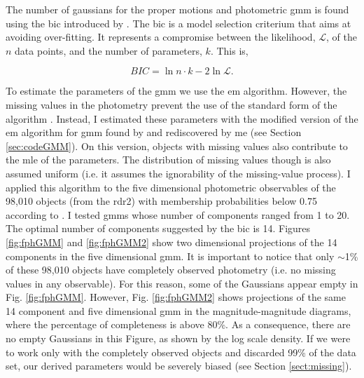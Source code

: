  

The number of gaussians for the proper motions and photometric \gls{gmm} is found using the \gls{bic} introduced by \citet{Schwarz1978}. The \gls{bic} is a model selection criterium that aims at avoiding over-fitting. It represents a compromise between the likelihood, $\mathcal{L}$, of the $n$ data points, and the number of parameters, $k$. This is,

\begin{equation}
\label{eq:BIC}
BIC = \ln{n}\cdot k - 2 \ln{\mathcal{L}}.
\end{equation}

To estimate the parameters of the \gls{gmm} we use the \gls{em} algorithm. However, the missing values in the photometry prevent the use of the standard form of the algorithm \cite[see for example Chapter 9 of][]{Bishop2006}.
Instead, I estimated these parameters with the modified version of the \gls{em} algorithm for \gls{gmm} found by \citet{McMichael1996} and rediscovered by me (see Section \ref{sec:codeGMM}). On this version, objects with missing values also contribute to the \gls{mle} of the parameters. The distribution of missing values though is also assumed uniform (i.e. it assumes the ignorability of the missing-value process). I applied this algorithm to the five dimensional photometric observables of the 98,010 objects (from the \gls{rdr2}) with membership probabilities below 0.75 according to \citet{Bouy2015}. I tested \glspl{gmm} whose number of components ranged from 1 to 20. The optimal number of components suggested by the \gls{bic} is 14. Figures \ref{fig:fphGMM} and \ref{fig:fphGMM2} show two dimensional projections of the 14 components in the five dimensional \gls{gmm}. It is important to notice that only $\sim$1\% of these 98,010 objects have completely observed photometry (i.e. no missing values in any observable). For this reason, some of the Gaussians appear empty in Fig. \ref{fig:fphGMM}. However, Fig. \ref{fig:fphGMM2} shows projections of the same 14 component and five dimensional \gls{gmm} in the magnitude-magnitude diagrams, where the percentage of completeness is above 80\%. As a consequence, there are no empty Gaussians in this Figure, as shown by the log scale density. If we were to work only with the completely observed objects and discarded 99\% of the data set, our derived parameters would be severely biased (see Section \ref{sect:missing}).


